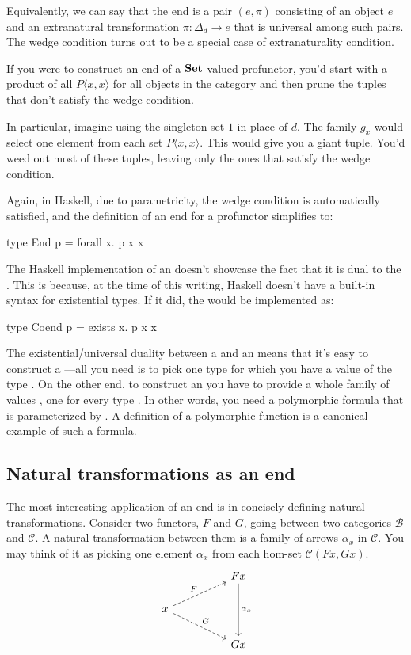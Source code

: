 \documentclass[DaoFP]{subfiles}
\begin{document}
Equivalently, we can say that the end is a pair $(e, \pi)$ consisting of an object $e$ and an  extranatural transformation $\pi \colon \Delta_d \to e$ that is universal among such pairs. The wedge condition turns out to be a special case of extranaturality condition.

If you were to construct an end of a $\mathbf{Set}$-valued profunctor, you'd start with a product of all $P \langle x, x \rangle$ for all objects in the category and then prune the tuples that don't satisfy the wedge condition. 

In particular, imagine using the singleton set $1$ in place of $d$. The family $g_x$ would select one element from each set $P \langle x, x \rangle$. This would give you a giant tuple. You'd weed out most of these tuples, leaving only the ones that satisfy the wedge condition. 

Again, in Haskell, due to parametricity, the wedge condition is automatically satisfied, and the definition of an end for a profunctor  simplifies to:

\begin{haskell}
type End p = forall x. p x x
\end{haskell}

The Haskell implementation of an  doesn't showcase the fact that it is dual to the . This is because, at the time of this writing, Haskell doesn't have a built-in syntax for existential types. If it did, the  would be implemented as:
\begin{haskell}
type Coend p = exists x. p x x
\end{haskell}

The existential/universal duality between a  and an  means that it's easy to construct a ---all you need is to pick one type  for which you have a value of the type . On the other end, to construct an  you have to provide a whole family of values , one for every type . In other words, you need a polymorphic formula that is parameterized by . A definition of a polymorphic function is a canonical example of such a formula.


\subsection{Natural transformations as an end}

The most interesting application of an end is in concisely defining natural transformations. Consider two functors, $F$ and $G$, going between two categories  $\mathcal{B}$ and $\mathcal{C}$. A natural transformation between them is a family of arrows $\alpha_x$ in $\mathcal{C}$. You may think of it as picking one element $\alpha_x$ from each hom-set  $\mathcal{C} (F x, G x)$.
\[
 \begin{tikzcd}
 && F x
 \arrow[dd, "\alpha_x"]
 \\
 x
 \arrow[urr, dashed, "F"]
 \arrow[drr, dashed, "G"]
 \\
 && G x
 \end{tikzcd}
\]
\end{document}
